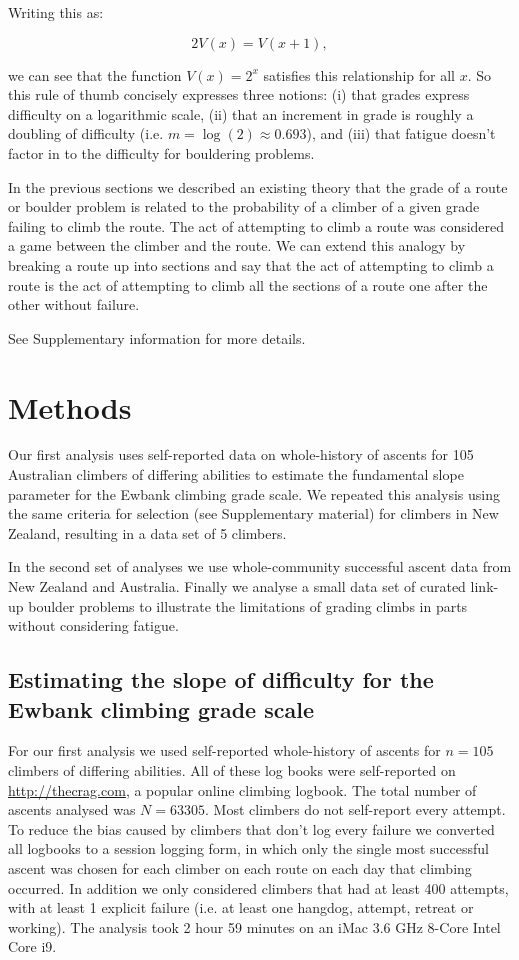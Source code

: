 \documentclass{article}
\newcommand{\C}{105}
\newcommand{\N}{63305}
\newcommand{\minattempts}{400}
\newcommand{\minfails}{1}
\newcommand{\stantime}{2 hour 59 minutes}
\newcommand{\Cnz}{5}
\begin{document}
Writing this as:

\begin{equation}
2V(x) = V(x+1),
\end{equation}

we can see that the function $V(x) = 2^x$ satisfies this relationship for all $x$. So this rule of thumb concisely expresses three notions: (i) that grades express difficulty on a logarithmic scale, (ii) that an increment in grade is roughly a doubling of difficulty (i.e. $m = \log(2) \approx 0.693$), and (iii) that fatigue doesn't factor in to the difficulty for bouldering problems.

In the previous sections we described an existing theory that the grade of a route or boulder problem is related to the probability of a climber of a given grade failing to climb the route. The act of attempting to climb a route was considered a game between the climber and the route. We can extend this analogy by breaking a route up into sections and say that the act of attempting to climb a route is the act of attempting to climb all the sections of a route one after the other without failure.

See Supplementary information for more details.

\section*{Methods}

Our first analysis uses self-reported data on whole-history of ascents for \C{} Australian climbers of differing abilities to estimate the fundamental slope parameter for the Ewbank climbing grade scale. We repeated this analysis using the same criteria for selection (see Supplementary material) for climbers in New Zealand, resulting in a data set of \Cnz{} climbers. 

In the second set of analyses we use whole-community successful ascent data from New Zealand and Australia. Finally we analyse a small data set of curated link-up boulder problems to illustrate the limitations of grading climbs in parts without considering fatigue.

\subsection*{Estimating the slope of difficulty for the Ewbank climbing grade scale}

For our first analysis we used self-reported whole-history of ascents for $n=\C{}$ climbers of differing abilities. All of these log books were self-reported on \url{http://thecrag.com}, a popular online climbing logbook. The total number of ascents analysed was $N=\N$. Most climbers do not self-report every attempt. To reduce the bias caused by climbers that don't log every failure we converted all logbooks to a session logging form, in which only the single most successful ascent was chosen for each climber on each route on each day that climbing occurred. In addition we only considered climbers that had at least \minattempts{} attempts, with at least \minfails{} explicit failure (i.e. at least one \gls{hangdog}, attempt, retreat or working). The analysis took \stantime{} on an iMac 3.6 GHz 8-Core Intel Core i9.
\end{document}
